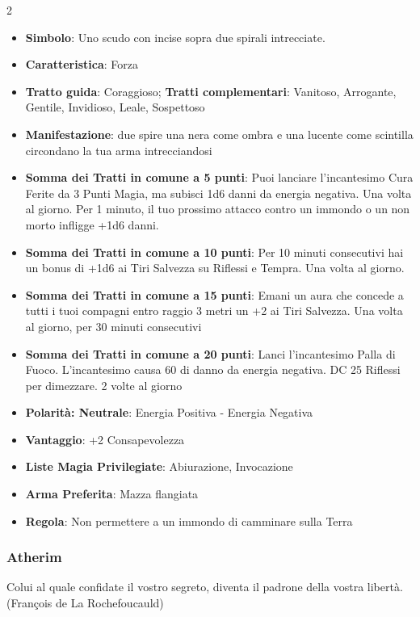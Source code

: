 \begin{multicols}{2}
\begin{itemize}[leftmargin=*] \setlength{\itemsep}{0pt}
\item \textbf{Simbolo}: Uno scudo con incise sopra due spirali intrecciate.
\item \textbf{Caratteristica}: Forza
\item \textbf{Tratto guida}: Coraggioso; \textbf{Tratti complementari}: Vanitoso, Arrogante, Gentile, Invidioso, Leale, Sospettoso
\item \textbf{Manifestazione}: due spire una nera come ombra e una lucente come scintilla circondano la tua arma intrecciandosi
\item \textbf{Somma dei Tratti in comune a 5 punti}: Puoi lanciare l'incantesimo Cura Ferite da 3 Punti Magia, ma subisci 1d6 danni da energia negativa. Una volta al giorno. Per 1 minuto, il tuo prossimo attacco contro un immondo o un non morto infligge +1d6 danni.
\item \textbf{Somma dei Tratti in comune a 10 punti}: Per 10 minuti consecutivi hai un bonus di +1d6 ai Tiri Salvezza su Riflessi e Tempra. Una volta al giorno.
\item \textbf{Somma dei Tratti in comune a 15 punti}: Emani un aura che concede a tutti i tuoi compagni entro raggio 3 metri un +2 ai Tiri Salvezza. Una volta al giorno, per 30 minuti consecutivi
\item \textbf{Somma dei Tratti in comune a 20 punti}: Lanci l'incantesimo Palla di Fuoco. L'incantesimo causa 60 di danno da energia negativa. DC 25 Riflessi per dimezzare. 2 volte al giorno
\item \textbf{Polarità: Neutrale}: Energia Positiva - Energia Negativa
\item \textbf{Vantaggio}: +2 Consapevolezza
\item \textbf{Liste Magia Privilegiate}: Abiurazione, Invocazione
\item \textbf{Arma Preferita}: Mazza flangiata
\item \textbf{Regola}: Non permettere a un immondo di camminare sulla Terra
\end{itemize}

\subsubsection{Atherim}\label{atherim}\hypertarget{atherim}{}

\begin{enfasi}{
Colui al quale confidate il vostro segreto, diventa il padrone della vostra libertà. (François de La Rochefoucauld)

}
\end{enfasi}
\end{multicols}
